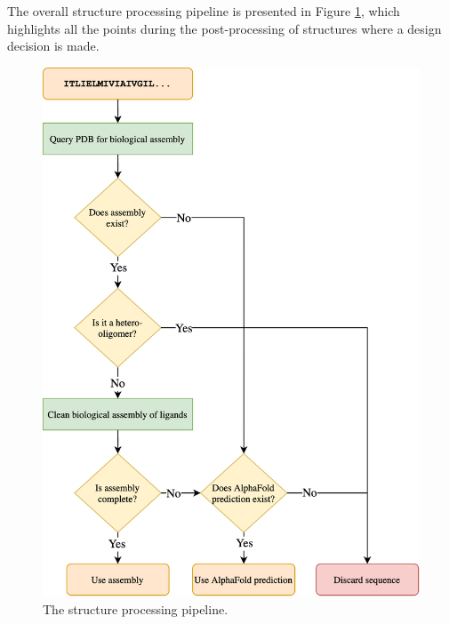 The overall structure processing pipeline is presented in Figure \ref{filtering-steps}, which highlights all the points during the post-processing of structures where a design decision is made. 
\begin{figure}
    \centering
    \includegraphics[scale=0.5]{masters-report/figures/sequence_recovery.png}
    \caption{The structure processing pipeline.}
    \label{filtering-steps}
\end{figure}

